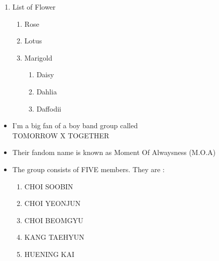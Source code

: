 \documentclass[16pt a4 paper]{article}
\author{SWATI SRI THINGBAIJAM \\swati\_t20$@$mtu.ac.in}
\date{29th October,2021}
\begin{document}
\maketitle
\begin{enumerate}
\item List of Flower
\begin{enumerate}
\item Rose \\
\item Lotus \\
\item Marigold
\begin{enumerate}
\item Daisy\\
\item Dahlia\\
\item Daffodii\\
\end{enumerate}
\end{enumerate}
\end{enumerate}
\begin{itemize}
\item I'm a big fan of a boy band group called \\TOMORROW X TOGETHER \\
\item Their fandom name is known as Moment Of Alwaysness (M.O.A)\\
\item The group consists of FIVE members. They are :\\
\begin{enumerate}
\item CHOI SOOBIN\\
\item CHOI YEONJUN\\
\item CHOI BEOMGYU\\
\item KANG TAEHYUN\\
\item HUENING KAI\\
\end{enumerate}
\end{itemize}
\end{document}
